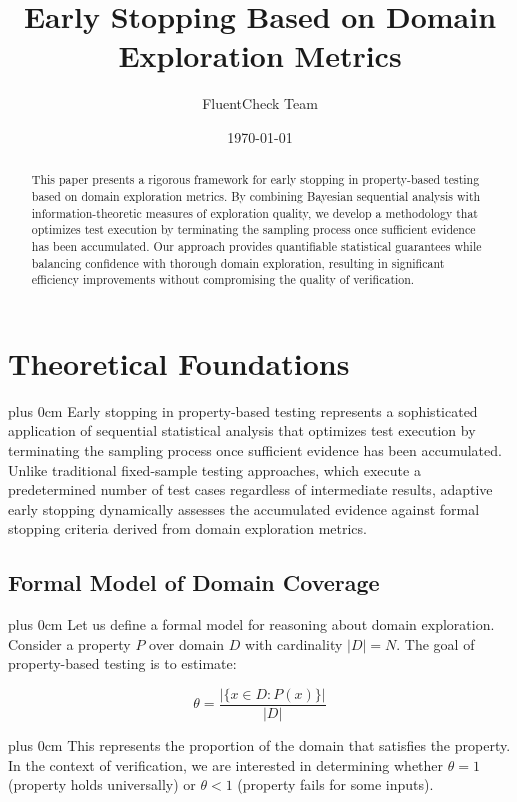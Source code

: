\documentclass[conference]{IEEEtran}
\title{\LARGE \textbf{Early Stopping Based on Domain Exploration Metrics}}
\author{\large FluentCheck Team}
\date{\today}
\newcommand{\justifytext}{\leftskip=0pt \rightskip=0pt plus 0cm}
\begin{document}
\maketitle

\begin{abstract}
\noindent This paper presents a rigorous framework for early stopping in property-based testing based on domain exploration metrics. By combining Bayesian sequential analysis with information-theoretic measures of exploration quality, we develop a methodology that optimizes test execution by terminating the sampling process once sufficient evidence has been accumulated. Our approach provides quantifiable statistical guarantees while balancing confidence with thorough domain exploration, resulting in significant efficiency improvements without compromising the quality of verification.
\end{abstract}



\section{Theoretical Foundations}

\justifytext
Early stopping in property-based testing represents a sophisticated application of sequential statistical analysis that optimizes test execution by terminating the sampling process once sufficient evidence has been accumulated. Unlike traditional fixed-sample testing approaches, which execute a predetermined number of test cases regardless of intermediate results, adaptive early stopping dynamically assesses the accumulated evidence against formal stopping criteria derived from domain exploration metrics.

\subsection{Formal Model of Domain Coverage}

\justifytext
Let us define a formal model for reasoning about domain exploration. Consider a property $P$ over domain $D$ with cardinality $|D|=N$. The goal of property-based testing is to estimate:

\begin{equation}
\theta = \frac{|\{x \in D : P(x)\}|}{|D|}
\end{equation}

\justifytext
This represents the proportion of the domain that satisfies the property. In the context of verification, we are interested in determining whether $\theta = 1$ (property holds universally) or $\theta < 1$ (property fails for some inputs).
\end{document}
